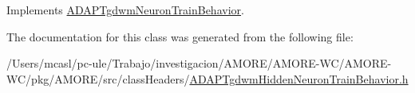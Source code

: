 Implements \hyperlink{class_a_d_a_p_tgdwm_neuron_train_behavior_af3524a3adf772e90a05f3d2693377d02}{ADAPTgdwmNeuronTrainBehavior}.



The documentation for this class was generated from the following file:\begin{DoxyCompactItemize}
\item 
/Users/mcasl/pc-\/ule/Trabajo/investigacion/AMORE/AMORE-\/WC/AMORE-\/WC/pkg/AMORE/src/classHeaders/\hyperlink{_a_d_a_p_tgdwm_hidden_neuron_train_behavior_8h}{ADAPTgdwmHiddenNeuronTrainBehavior.h}\end{DoxyCompactItemize}
